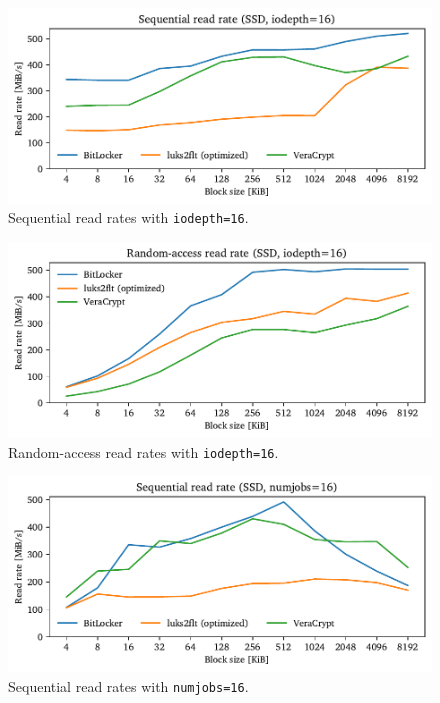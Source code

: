 \begin{figure}[htb!]
	\center
	\includegraphics[scale=1]{../fig/performance.hwexperiments.optseqqueue.pdf}
	\caption[
		Sequential read rates with \texttt{iodepth=16}
	]{
		Sequential read rates with \texttt{iodepth=16}. 
	}
	\label{fig:performance.hwexperiments.optseqqueue}
\end{figure}

\begin{figure}[htb!]
	\center
	\includegraphics[scale=1]{../fig/performance.hwexperiments.optrandqueue.pdf}
	\caption[
		Random-access read rates with \texttt{iodepth=16}
	]{
		Random-access read rates with \texttt{iodepth=16}. 
	}
	\label{fig:performance.hwexperiments.optrandqueue}
\end{figure}

\begin{figure}[htb!]
	\center
	\includegraphics[scale=1]{../fig/performance.hwexperiments.optseqthreads.pdf}
	\caption[
		Sequential read rates with \texttt{numjobs=16}
	]{
		Sequential read rates with \texttt{numjobs=16}. 
	}
	\label{fig:performance.hwexperiments.optseqthreads}
\end{figure}

